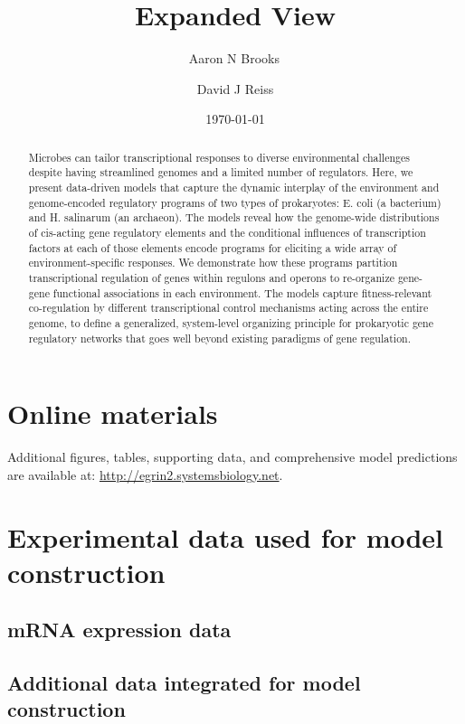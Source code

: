 \documentclass[11pt]{article}
\title{Expanded View}
\author{
        Aaron N Brooks\, \\
            \and
        David J Reiss
}
\date{\today}
\begin{document}
\maketitle
 
\tableofcontents
\newpage
\listoffigures
\newpage
\listoftables 
\newpage

\begin{abstract}
Microbes can tailor transcriptional responses to diverse environmental
challenges despite having streamlined genomes and a limited number of
regulators. Here, we present data-driven models that capture the
dynamic interplay of the environment and genome-encoded regulatory
programs of two types of prokaryotes: E. coli (a bacterium) and
H. salinarum (an archaeon). The models reveal how the genome-wide
distributions of cis-acting gene regulatory elements and the
conditional influences of transcription factors at each of those
elements encode programs for eliciting a wide array of
environment-specific responses. We demonstrate how these programs
partition transcriptional regulation of genes within regulons and
operons to re-organize gene-gene functional associations in each
environment. The models capture fitness-relevant co-regulation by
different transcriptional control mechanisms acting across the entire
genome, to define a generalized, system-level organizing principle for
prokaryotic gene regulatory networks that goes well beyond existing
paradigms of gene regulation.
\end{abstract}

\section{Online materials}
Additional figures, tables, supporting data, and comprehensive model
predictions are available at: \newline
\url{http://egrin2.systemsbiology.net}.

\section{Experimental data used for model construction}\label{data}

\subsection{mRNA expression data}



\subsection{Additional data integrated for model construction}
\end{document}
